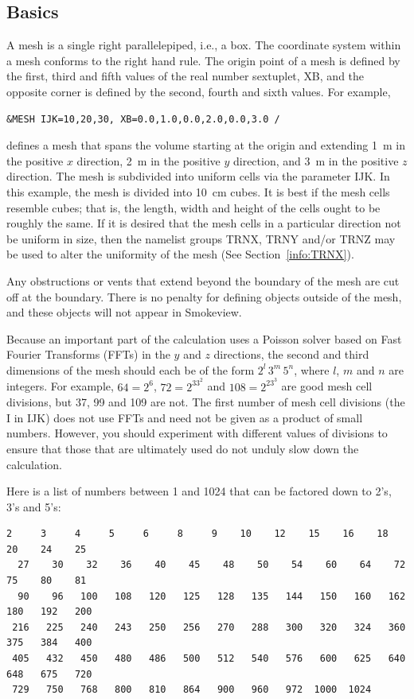 \documentclass[11pt]{book}
\begin{document}
\subsection{Basics}
\label{info:MESH_Basics}

A mesh is a single right parallelepiped, i.e., a box.
The coordinate system within a mesh conforms to the right hand rule.
The origin point of a mesh is defined by the first, third
and fifth values of the real number sextuplet, {\ct XB}, and the opposite
corner is defined by the second, fourth and sixth values.
For example,
\begin{lstlisting}
&MESH IJK=10,20,30, XB=0.0,1.0,0.0,2.0,0.0,3.0 /
\end{lstlisting}
defines a mesh that spans the volume starting at the origin and extending 1~m in the positive
$x$ direction, 2~m in the positive $y$ direction, and 3~m in the positive $z$ direction.
The mesh is subdivided into uniform cells via the parameter
{\ct IJK}. In this example, the mesh is divided into 10~cm cubes. It is best if the mesh cells resemble cubes; that is, the
length, width and height of the cells ought to be roughly the same.
If it is desired that the mesh cells in a particular direction not be uniform in size,
then the namelist groups {\ct TRNX}, {\ct TRNY} and/or {\ct TRNZ} may be used to alter the
uniformity of the mesh (See Section~\ref{info:TRNX}).

Any obstructions or vents that extend beyond the boundary of the mesh
are cut off at the boundary. There is no penalty for defining objects
outside of the mesh, and these objects will not appear in Smokeview.


Because an important part of the calculation uses a Poisson solver based on
Fast Fourier Transforms (FFTs) in the $y$ and $z$ directions, the second and third dimensions
of the mesh should each be of the form $2^l \, 3^m \, 5^n$, where
$l$, $m$ and $n$ are integers. For example,
$64=2^6$, $72=2^33^2$ and $108=2^23^3$ are good mesh cell divisions, but 37, 99 and 109 are not.
The first number of mesh cell divisions (the {\ct I} in {\ct IJK}) does not use FFTs and need not be given as a
product of small numbers. However, you should experiment with different values of
divisions to ensure that those that are ultimately used do not unduly slow down the calculation.

Here is a list of numbers between 1 and 1024 that can be factored
down to 2's, 3's and 5's:
\begin{lstlisting}[basicstyle=\scriptsize\ttfamily]
   2     3     4     5     6     8     9    10    12    15    16    18    20    24    25
  27    30    32    36    40    45    48    50    54    60    64    72    75    80    81
  90    96   100   108   120   125   128   135   144   150   160   162   180   192   200
 216   225   240   243   250   256   270   288   300   320   324   360   375   384   400
 405   432   450   480   486   500   512   540   576   600   625   640   648   675   720
 729   750   768   800   810   864   900   960   972  1000  1024
\end{lstlisting}
\end{document}
